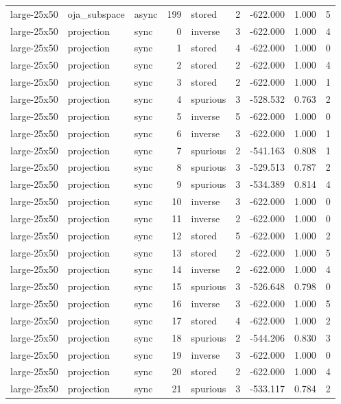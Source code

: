 \begin{tabular}{lllrlrrrr}
large-25x50 & oja\_subspace & async & 199 & stored & 2 & -622.000 & 1.000 & 5 \\
large-25x50 & projection & sync & 0 & inverse & 3 & -622.000 & 1.000 & 4 \\
large-25x50 & projection & sync & 1 & stored & 4 & -622.000 & 1.000 & 0 \\
large-25x50 & projection & sync & 2 & stored & 2 & -622.000 & 1.000 & 4 \\
large-25x50 & projection & sync & 3 & stored & 2 & -622.000 & 1.000 & 1 \\
large-25x50 & projection & sync & 4 & spurious & 3 & -528.532 & 0.763 & 2 \\
large-25x50 & projection & sync & 5 & inverse & 5 & -622.000 & 1.000 & 0 \\
large-25x50 & projection & sync & 6 & inverse & 3 & -622.000 & 1.000 & 1 \\
large-25x50 & projection & sync & 7 & spurious & 2 & -541.163 & 0.808 & 1 \\
large-25x50 & projection & sync & 8 & spurious & 3 & -529.513 & 0.787 & 2 \\
large-25x50 & projection & sync & 9 & spurious & 3 & -534.389 & 0.814 & 4 \\
large-25x50 & projection & sync & 10 & inverse & 3 & -622.000 & 1.000 & 0 \\
large-25x50 & projection & sync & 11 & inverse & 2 & -622.000 & 1.000 & 0 \\
large-25x50 & projection & sync & 12 & stored & 5 & -622.000 & 1.000 & 2 \\
large-25x50 & projection & sync & 13 & stored & 2 & -622.000 & 1.000 & 5 \\
large-25x50 & projection & sync & 14 & inverse & 2 & -622.000 & 1.000 & 4 \\
large-25x50 & projection & sync & 15 & spurious & 3 & -526.648 & 0.798 & 0 \\
large-25x50 & projection & sync & 16 & inverse & 3 & -622.000 & 1.000 & 5 \\
large-25x50 & projection & sync & 17 & stored & 4 & -622.000 & 1.000 & 2 \\
large-25x50 & projection & sync & 18 & spurious & 2 & -544.206 & 0.830 & 3 \\
large-25x50 & projection & sync & 19 & inverse & 3 & -622.000 & 1.000 & 0 \\
large-25x50 & projection & sync & 20 & stored & 2 & -622.000 & 1.000 & 4 \\
large-25x50 & projection & sync & 21 & spurious & 3 & -533.117 & 0.784 & 2 \\

\end{tabular}
